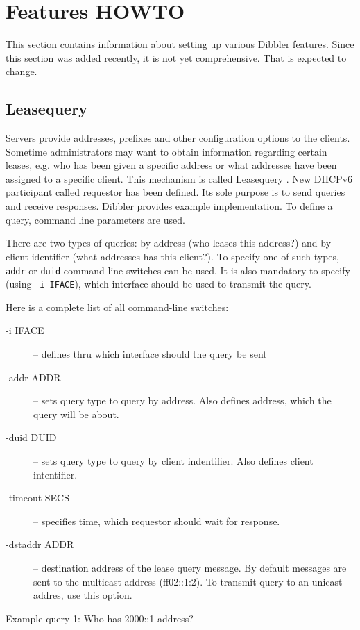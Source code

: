 \section{Features HOWTO}
This section contains information about setting up various Dibbler
features. Since this section was added recently, it is not yet
comprehensive. That is expected to change.

\subsection{Leasequery}
\label{features-leasequery}
Servers provide addresses, prefixes and other configuration options to
the clients. Sometime administrators may want to obtain information
regarding certain leases, e.g. who has been given a specific address
or what addresses have been assigned to a specific client. This
mechanism is called Leasequery \cite{rfc5007}. New DHCPv6 participant
called requestor has been defined. Its sole purpose is to send queries
and receive responses. Dibbler provides example implementation. To
define a query, command line parameters are used. 

There are two types of queries: by address (who leases this address?)
and by client identifier (what addresses has this client?). To specify
one of such types, \verb+-addr+ or \verb+duid+ command-line switches
can be used. It is also mandatory to specify (using \verb+-i IFACE+),
which interface should be used to transmit the query.

Here is a complete list of all command-line switches:

\begin{description}
\item[-i IFACE] -- defines thru which interface should the query be sent
\item[-addr ADDR] -- sets query type to query by address. Also defines
  address, which the query will be about.
\item[-duid DUID] -- sets query type to query by client
  indentifier. Also defines client intentifier.
\item[-timeout SECS] -- specifies time, which requestor should wait
  for response.
\item[-dstaddr ADDR] -- destination address of the lease query
  message. By default messages are sent to the multicast address
  (ff02::1:2). To transmit query to an unicast addres, use this option.
\end{description}

Example query 1: Who has 2000::1 address?

